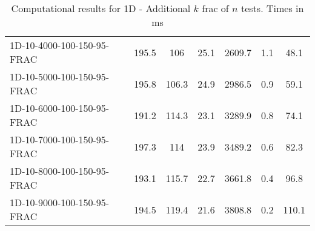 \documentclass{article}
\begin{document}
\begin{table}[h]
\begin{center}
\begin{tabular}{|l||c|c|c|c|c|c|}
            1D-10-4000-100-150-95-FRAC                     & 195.5 & 106        & 25.1       & 2609.7      & 1.1       & 48.1       \\
            1D-10-5000-100-150-95-FRAC                     & 195.8 & 106.3      & 24.9       & 2986.5      & 0.9       & 59.1       \\
            1D-10-6000-100-150-95-FRAC                     & 191.2 & 114.3      & 23.1       & 3289.9      & 0.8       & 74.1       \\
            1D-10-7000-100-150-95-FRAC                     & 197.3 & 114        & 23.9       & 3489.2      & 0.6       & 82.3       \\
            1D-10-8000-100-150-95-FRAC                     & 193.1 & 115.7      & 22.7       & 3661.8      & 0.4       & 96.8       \\
            1D-10-9000-100-150-95-FRAC                     & 194.5 & 119.4      & 21.6       & 3808.8      & 0.2       & 110.1      \\
            \hline
        \end{tabular}
    \end{center}
        \caption{Computational results for 1D - Additional $k$ frac of $n$ tests. Times in ms}
        \label{tab:1d_res_additional}
    \end{table}
\end{document}
